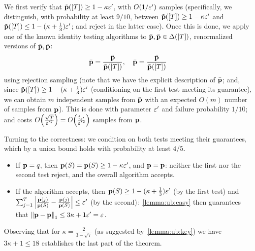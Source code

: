     We first verify that $\tilde{\mathbf{p}}([T]) \geq 1-\kappa\varepsilon'$, with $\bigO{{1}/{\eps'}}$ samples (specifically, we distinguish, with probability at least $9/10$, between $\tilde{\mathbf{p}}([T]) \geq 1-\kappa\varepsilon'$ and $\tilde{\mathbf{p}}([T]) \leq 1-(\kappa+\tfrac{1}{3})\varepsilon'$; and reject in the latter case). Once this is done, we apply one of the known identity testing algorithms to $\bar{\mathbf{p}},\bar{\mathbf{p}}\in\Delta\!\left([T]\right)$, renormalized versions of $\tilde{\mathbf{p}},\tilde{\mathbf{p}}$:
\[
    \bar{\mathbf{p}} = \frac{\tilde{\mathbf{p}}}{\tilde{\mathbf{p}}([T])},\quad \bar{\mathbf{p}} = \frac{\tilde{\mathbf{p}}}{\tilde{\mathbf{p}}([T])}
\]
using rejection sampling (note that we have the explicit description of $\bar{\mathbf{p}}$; and, since $\tilde{\mathbf{p}}([T]) \geq 1-(\kappa+\tfrac{1}{3})\varepsilon'$ (conditioning on the first test meeting its guarantee), we can obtain $m$ independent samples
from $\bar{\mathbf{p}}$ with an expected $O(m)$ number of samples from $\mathbf{p}$). This is done with parameter $\varepsilon'$ and failure probability $1/10$; and costs $\bigO{\frac{\sqrt{T}}{{\eps'}^2}}=\bigO{\frac{t_{\eps'}}{{\eps'}^{2}}}$ samples from $\mathbf{p}$.

Turning to the correctness: we condition on both tests meeting their guarantees, which by a union bound holds with probability at least $4/5$.
\begin{itemize}
  \item If $\mathbf{p}=q$, then $\mathbf{p}(S) = \mathbf{p}(S) \geq 1-\kappa\varepsilon'$, and $\bar{\mathbf{p}}=\bar{\mathbf{p}}$: neither the first nor the second test reject, and the overall algorithm accepts.
  \item If the algorithm accepts, then $\mathbf{p}(S) \geq 1-(\kappa+\tfrac{1}{3})\varepsilon'$ (by the first test) and $\sum_{j=1}^T \left\lvert  \frac{\tilde{\mathbf{p}}(j)}{\mathbf{p}(S)} - \frac{\tilde{\mathbf{p}}(j)}{\mathbf{p}(S)}  \right\rvert \leq \varepsilon'$ (by the second):~\cref{lemma:ub:easy} then guarantees that ${\lVert\mathbf{p}-\mathbf{p}{\rVert}}_1 \leq 3\kappa+1 \varepsilon' = \varepsilon$.
\end{itemize}
Observing that for $\kappa=\frac{2}{3-\sqrt{7}}$ (as suggested by~\cref{lemma:ub:key}) we have $3\kappa+1\leq 18$ establishes the last part of the theorem.

\begin{remark}
\end{remark}

